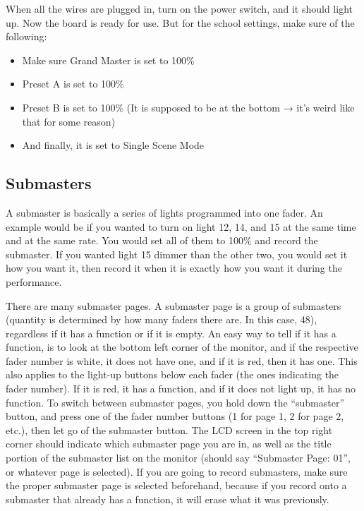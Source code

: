\documentclass{article}
\begin{document}
When all the wires are plugged in, turn on the power switch, and it should light up. Now the board is ready for use. But for the school settings, make sure of the following:
\begin{itemize}
    \item Make sure Grand Master is set to 100\%
    \item Preset A is set to 100\%
    \item Preset B is set to 100\% (It is supposed to be at the bottom → it’s weird like that for some reason)
    \item And finally, it is set to Single Scene Mode
\end{itemize}


\subsection{Submasters}

A submaster is basically a series of lights programmed into one fader. An example would be if you wanted to turn on light 12, 14, and 15 at the same time and at the same rate. You would set all of them to 100\% and record the submaster. If you wanted light 15 dimmer than the other two, you would set it how you want it, then record it when it is exactly how you want it during the performance. 

There are many submaster pages. A submaster page is a group of submasters (quantity is determined by how many faders there are. In this case, 48), regardless if it has a function or if it is empty. An easy way to tell if it has a function, is to look at the bottom left corner of the monitor, and if the respective fader number is white, it does not have one, and if it is red, then it has one. This also applies to the light-up buttons below each fader (the ones indicating the fader number). If it is red, it has a function, and if it does not light up, it has no function. To switch between submaster pages, you hold down the “submaster” button, and press one of the fader number buttons (1 for page 1, 2 for page 2, etc.), then let go of the submaster button. The LCD screen in the top right corner should indicate which submaster page you are in, as well as the title portion of the submaster list on the monitor (should say “Submaster Page: 01”, or whatever page is selected). If you are going to record submasters, make sure the proper submaster page is selected beforehand, because if you record onto a submaster that already has a function, it will erase what it was previously.
\end{document}

